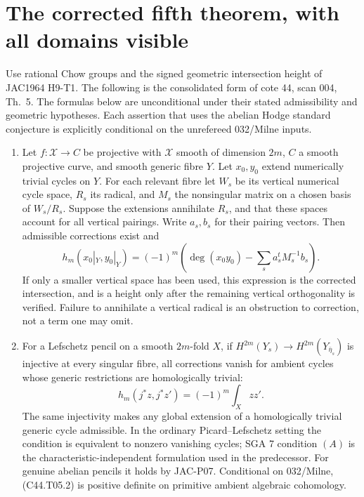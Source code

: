 \section{The corrected fifth theorem, with all domains visible}

\begin{theorem}\label{thm:final-th5}
Use rational Chow groups and the signed geometric intersection height
of JAC1964 H9-T1. The following is the consolidated form of cote 44,
scan 004, Th.~5. The formulas below are unconditional under their
stated admissibility and geometric hypotheses. Each assertion that
uses the abelian Hodge standard conjecture is explicitly conditional
on the unrefereed 032/Milne inputs.

\begin{enumerate}
\item Let $f:\mathcal X\to C$ be projective with $\mathcal X$ smooth
of dimension $2m$, $C$ a smooth projective curve, and smooth generic
fibre $Y$. Let $x_0,y_0$ extend numerically trivial cycles on $Y$.
For each relevant fibre let $W_s$ be its vertical numerical cycle
space, $R_s$ its radical, and $M_s$ the nonsingular matrix on a chosen
basis of $W_s/R_s$. Suppose the extensions annihilate $R_s$, and
that these spaces account for all vertical pairings. Write $a_s,b_s$
for their pairing vectors. Then admissible corrections exist and
\[
 h_m(x_0|_Y,y_0|_Y)=(-1)^m
 \left(\deg(x_0y_0)-\sum_s a_s^{t}M_s^{-1}b_s\right).
 \tag{C44.T05.1}
\]
If only a smaller vertical space has been used, this expression is
the corrected intersection, and is a height only after the remaining
vertical orthogonality is verified. Failure to annihilate a vertical
radical is an obstruction to correction, not a term one may omit.

\item For a Lefschetz pencil on a smooth $2m$-fold $X$, if
$H^{2m}(Y_s)\to H^{2m}(Y_{\bar\eta_s})$ is injective at every
singular fibre, all corrections vanish for ambient cycles whose
generic restrictions are homologically trivial:
\[
                  h_m(j^*z,j^*z')=(-1)^m\int_Xzz'.
 \tag{C44.T05.2}
\]
The same injectivity makes any global extension of a homologically
trivial generic cycle admissible. In the ordinary Picard--Lefschetz
setting the condition is equivalent to nonzero vanishing cycles;
SGA 7 condition $(A)$ is the characteristic-independent formulation
used in the predecessor. For genuine abelian pencils it holds by
JAC-P07. Conditional on 032/Milne, (C44.T05.2) is positive definite
on primitive ambient algebraic cohomology.


\end{enumerate}
\end{theorem}
